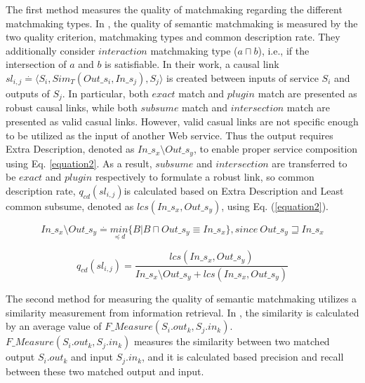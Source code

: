 The first method measures the quality of matchmaking regarding the different matchmaking types. In \cite{lecue2007making}, the quality of semantic matchmaking is measured by the two quality criterion, matchmaking types and common description rate. They additionally consider $interaction$ matchmaking type ($a \sqcap b$), i.e., if the intersection of $a$ and $b$ is satisfiable. In their work, a causal link \begin{math} sl_{i,j} \stackrel{.}{=} \langle S_i, Sim_{T}(Out\_s_i,In\_s_j),S_j  \rangle \end{math} is created between inputs of service $S_i$ and outputs of $S_j$. In particular, both $exact$ match and $plugin$ match are presented as robust causal links, while both $subsume$ match and $intersection$ match are presented as valid casual links. However, valid casual links are not specific enough to be utilized as the input of another Web service. Thus the output requires Extra Description, denoted as \begin{math} In\_s_x \setminus Out\_s_y \end{math}, to enable proper service composition using Eq. \ref{equation2}. As a result, $subsume$ and $intersection$ are transferred to be $exact$ and $plugin$ respectively to formulate a robust link, so common description rate, \begin{math} q_{cd}(sl_{i,j}) \end{math}is calculated based on Extra Description and Least common subsume, denoted as \begin{math} lcs (In\_s_x, Out\_s_y) \end{math}, using Eq. (\ref{equation2}).

\begin{equation}
In\_s_x \setminus Out\_s_y \stackrel{.}{=} \underset {\preceq d}{min} \{ B|B\sqcap  Out\_s_y \equiv In\_s_x  \} , since \  Out\_s_y \sqsupseteq In\_s_x
 \label{equation2}
\end{equation}


\begin{equation}
q_{cd}(sl_{i,j}) = \frac{lcs (In\_s_x, Out\_s_y)} {In\_s_x \setminus Out\_s_y + lcs (In\_s_x, Out\_s_y)}
 \label{equation3}
\end{equation}

The second method for measuring the quality of semantic matchmaking utilizes a similarity measurement from information retrieval. In \cite{pop2009immune}, the similarity is calculated by an average value of $F\_Measure(S_i.out_k, S_j.in_k)$. $F\_Measure(S_i.out_k, S_j.in_k)$ measures the similarity between  two matched output $S_i.out_k$ and input $S_j.in_k$, and it is calculated based precision and recall between these two matched output and input.


